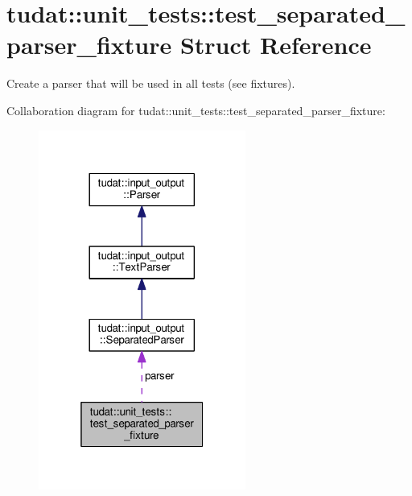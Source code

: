 \hypertarget{structtudat_1_1unit__tests_1_1test__separated__parser__fixture}{}\section{tudat\+:\+:unit\+\_\+tests\+:\+:test\+\_\+separated\+\_\+parser\+\_\+fixture Struct Reference}
\label{structtudat_1_1unit__tests_1_1test__separated__parser__fixture}


Create a parser that will be used in all tests (see fixtures).  




Collaboration diagram for tudat\+:\+:unit\+\_\+tests\+:\+:test\+\_\+separated\+\_\+parser\+\_\+fixture\+:
\nopagebreak
\begin{figure}[H]
\begin{center}
\leavevmode
\includegraphics[width=193pt]{structtudat_1_1unit__tests_1_1test__separated__parser__fixture__coll__graph}
\end{center}
\end{figure}
